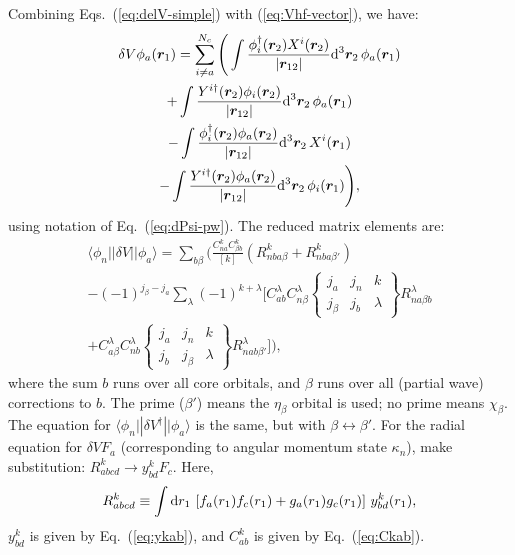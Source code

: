 \documentclass[10pt,twocolumn,a4paper]{article}%
\newcommand{\bra}[1]{\ensuremath{\langle #1|}}	%
\newcommand{\ket}[1]{\ensuremath{|#1\rangle}}	%
\newcommand{\sixj}[6]{\ensuremath{\begin{Bmatrix}#1&#2&#3\\#4&#5&#6\end{Bmatrix}}}	%
\renewcommand{\v}[1]{\ensuremath{\boldsymbol{#1}}}		%
\newcommand{\be}{\begin{equation}}
\newcommand{\ee}{\end{equation}}
\def\d{\ensuremath{{\rm d}}}
\renewcommand{\b}{\ensuremath{\beta}}
\begin{document}




Combining Eqs.~(\ref{eq:delV-simple}) with (\ref{eq:Vhf-vector}), we have:
\begin{multline}\label{eq:del-Vhf-vector}
\delta V\phi_a(\v{r}_1) = \sum_{i\neq a}^{N_c}\Bigg(
\int \frac{\phi_i^\dag(\v{r}_2)X^i(\v{r}_2)}{|\v{r}_{12}|}\d^3\v{r}_2\,\phi_a(\v{r}_1)\\
+\int \frac{Y^{i\dag}(\v{r}_2)\phi_i(\v{r}_2)}{|\v{r}_{12}|}\d^3\v{r}_2\,\phi_a(\v{r}_1)\\
-\int \frac{\phi_i^\dag(\v{r}_2)\phi_a(\v{r}_2)}{|\v{r}_{12}|}\d^3\v{r}_2\,X^i(\v{r}_1)\\
-\int \frac{Y^{i\dag}(\v{r}_2)\phi_a(\v{r}_2)}{|\v{r}_{12}|}\d^3\v{r}_2\,\phi_i(\v{r}_1)
\Bigg),
\end{multline}
using notation of Eq.~(\ref{eq:dPsi-pw}).
%
The reduced matrix elements are:
\begin{multline}\label{eq:dV-rme}
\bra{\phi_n}|\delta V|\ket{\phi_a}
 = 
 \sum_{b\beta}\Bigg(
\frac{C^k_{na}C^k_{\b b}}{[k]}
(R^k_{nba\b} + R^k_{nba\b'})
\\
-(-1)^{j_\b-j_a}\sum_\lambda(-1)^{k+\lambda}
\Bigg[
C^\lambda_{ab}C^\lambda_{n \beta}\sixj{j_a}{j_n}{k}{j_\beta}{j_b}{\lambda}R^\lambda_{na\b b} 
\\
+C^\lambda_{a \beta}C^\lambda_{n b}\sixj{j_a}{j_n}{k}{j_b}{j_\beta}{\lambda}R^\lambda_{nab\b'} 
\Bigg]
\Bigg),
\end{multline}
where the sum $b$ runs over all core orbitals, and $\beta$ runs over all (partial wave) corrections to $b$.
The prime ($\beta'$) means the $\eta_\beta$ orbital is used; no prime means $\chi_\beta$.
The equation for $\bra{\phi_n}|\delta V^\dag|\ket{\phi_a}$ is the same, but with $\beta\leftrightarrow\beta'$.
For the radial equation for $\delta V F_a$ (corresponding to angular momentum state $\kappa_n$), make substitution: 
$R^k_{abcd}\to y^k_{bd}F_c$.
%
Here, 
\be\label{eq:Rkabcd}
R^k_{abcd} \equiv \int\d r_1 \, \left[f_a(r_1)f_c(r_1) + g_a(r_1)g_c(r_1)\right]\, y^k_{bd}(r_1),
\ee
$y^k_{bd}$ is given by Eq.~(\ref{eq:ykab}), and $C^k_{ab}$ is given by Eq.~(\ref{eq:Ckab}).
\end{document}
